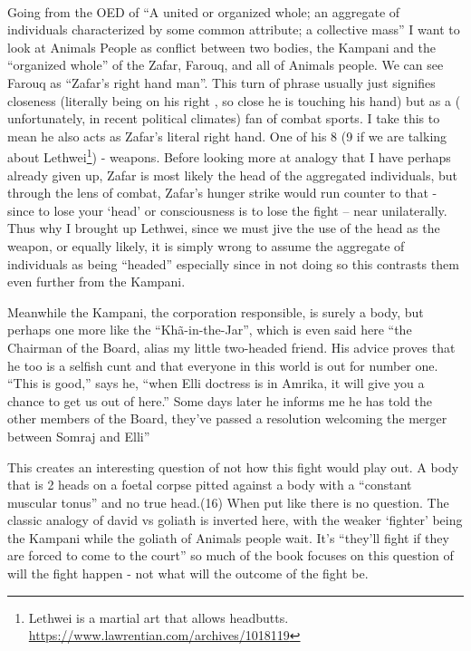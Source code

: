 

\paragraph{}

Going from the OED of ``A united or organized whole; an aggregate of individuals characterized
by some common attribute; a collective mass'' I want to look at Animals People as conflict between two bodies, the Kampani and the ``organized whole'' of the Zafar, Farouq, and all of Animals people. 
We can see Farouq as ``Zafar’s right hand man''. This turn of phrase usually just signifies closeness (literally being on his right , so close he is touching his hand) but as a ( unfortunately, in recent political climates) fan of combat sports. I take this to mean he also acts as Zafar's literal right hand. One of his 8 (9 if we are talking about Lethwei\footnote{Lethwei is a martial art that allows headbutts. \url{https://www.lawrentian.com/archives/1018119}})  - weapons. Before looking more at analogy that I have perhaps already given up, Zafar is most likely the head of the aggregated individuals, but through the lens of combat, Zafar's hunger strike would run counter to that - since to lose your `head' or consciousness  is to lose the fight -- near unilaterally. Thus why I brought up Lethwei, since we must jive the use of the head as the weapon, or equally likely, it is simply wrong to assume the aggregate of individuals as being ``headed'' especially since in not doing so this contrasts them even further from the Kampani.

Meanwhile the Kampani, the corporation responsible, is surely a body, but perhaps one more like the ``Khã-in-the-Jar'', which is even said here ``the Chairman of the Board, alias my little two-headed friend. His advice proves that he too is a selfish cunt and that everyone in this world is out for number one. “This is good,” says he, “when Elli doctress is in Amrika, it will give you a chance to get us out of here.” Some days later he informs me he has told the other members of the Board, they’ve passed a resolution welcoming the merger between Somraj and Elli'' 

This creates an interesting question of not how this fight would play out. A body that is 2 heads on a foetal corpse pitted against a body with a ``constant muscular tonus'' and no true head.(16) When put like there is no question. The classic analogy of david vs goliath is inverted here, with the weaker `fighter' being the Kampani while the goliath of Animals people wait. It's ``they’ll fight if they are forced to come to the court'' so much of the book focuses on this question of will the fight happen - not what will the outcome of the fight be. 
